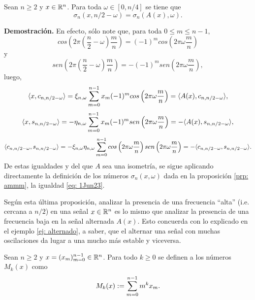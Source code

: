 \begin{prop}
\label{prop: operaodr de alternancia y sigmas}
Sean $n \geq 2$ y $x \in \mathbb{R}^{n}$. 
Para toda $\omega \in [0, n/4]$ se tiene que
\begin{equation}
	\label{eq: 1Jun23}
	\sigma_{n}(x, n/2-\omega) = \sigma_{n}(A(x), \omega).
\end{equation}
\end{prop}
\noindent
\textbf{Demostración.}
En efecto, sólo note que, para toda
$0 \leq m \leq n-1$,
\[
cos\left( 
2 \pi \left(
\frac{n}{2} - \omega
\right) \frac{m}{n}
\right) = 
(-1)^{m}
cos\left( 
2 \pi \omega \frac{m}{n}
\right)
\]
y 
\[
sen\left( 
2 \pi \left(
\frac{n}{2} - \omega
\right) \frac{m}{n}
\right) = 
-(-1)^{m}
sen\left( 
2 \pi \omega \frac{m}{n}
\right),
\]
luego, 
\[
\langle 
x, c_{n, n/2-\omega} 
\rangle
= 
\xi_{n, \omega} \sum\limits_{m=0}^{n-1}
x_{m}(-1)^{m} cos\left( 
2 \pi \omega \frac{m}{n}
\right)
 = \langle 
A(x), c_{n, n/2-\omega} 
\rangle,
\]
\[
\langle 
x, s_{n, n/2-\omega} 
\rangle
= 
-\eta_{n, \omega} \sum\limits_{m=0}^{n-1}
x_{m}(-1)^{m} sen\left( 
2 \pi \omega \frac{m}{n}
\right)
 = - \langle 
A(x), s_{n, n/2-\omega} 
\rangle,
\]
\[
\langle 
c_{n, n/2-\omega}, s_{n, n/2-\omega}
\rangle
= 
-\xi_{n, \omega} \eta_{n, \omega} \sum\limits_{m=0}^{n-1}
cos\left( 
2 \pi \omega \frac{m}{n}
\right) sen\left( 
2 \pi \omega \frac{m}{n}
\right)
 = - \langle 
c_{n, n/2-\omega}, s_{n, n/2-\omega}
\rangle.
\]
De estas igualdades y 
del que $A$ sea una isometría, se sigue aplicando
directamente
la definición de
los números $\sigma_{n}(x, \omega)$
dada en la proposición \ref{prp: ammm},
la igualdad \ref{eq: 1Jun23}.
\QEDB
\vspace{0.2cm}

Según esta última proposición, 
analizar la presencia
de una frecuencia ``alta'' (i.e. cercana a $n/2$) 
en una señal $x \in \mathbb{R}^{n}$
es lo mismo que analizar la presencia de una frecuencia baja en la
señal alternada $A(x)$. Esto concuerda con lo explicado en el ejemplo
\ref{ej: alternado}, a saber, 
que el alternar una señal con muchas oscilaciones da lugar a una
mucho más estable y viceversa.

\begin{defi}
\label{def: momentos de x}
Sean $n \geq 2$ y $x= (x_{m})_{m=0}^{n-1} \in \mathbb{R}^{n}$.
Para todo $k \geq 0$
se definen a los números $M_{k}(x)$ como
	\begin{equation}
	\label{eq: momento k esimo de x}
	M_{k}(x) := \sum\limits_{m=0}^{n-1}m^{k}x_{m}.
	\end{equation}
\end{defi}


